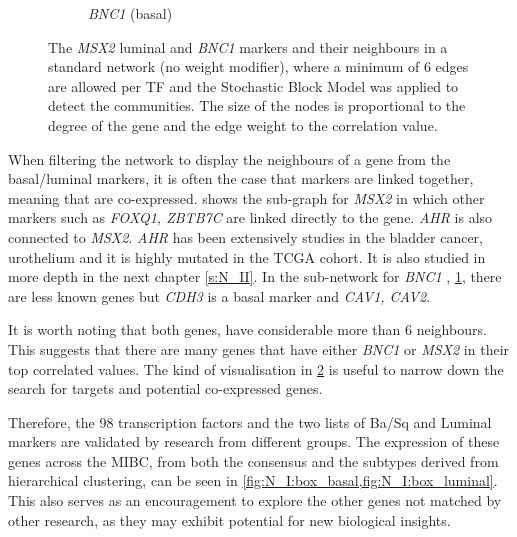 \begin{figure}[!b]
\begin{subfigure}[!t]{0.49\textwidth}
        \caption{\textit{BNC1} (basal)}
        \label{fig:N_I:net_BNC1}
    \end{subfigure}
    \caption{The \textit{MSX2} luminal and \textit{BNC1} markers and their neighbours in a standard network (no weight modifier), where a minimum of 6 edges are allowed per TF and the Stochastic Block Model was applied to detect the communities. The size of the nodes is proportional to the degree of the gene and the edge weight to the correlation value.}
    
    \label{fig:N_I:net_neighbours}
\end{figure}

When filtering the network to display the neighbours of a  gene from the basal/luminal markers, it is often the case that markers are linked together, meaning that are co-expressed.  shows the sub-graph for \textit{MSX2} in which other markers such as \textit{FOXQ1, ZBTB7C} are linked directly to the gene. \textit{AHR} is also connected to \textit{MSX2}. \textit{AHR} has been extensively studies in the bladder cancer, urothelium and it is highly mutated in the TCGA cohort. It is also studied in more depth in the next chapter \ref{s:N_II}. In the sub-network for \textit{BNC1} , \cref{fig:N_I:net_BNC1}, there are less known genes but \textit{CDH3} is a basal marker \citep{Dadhania2016-cb} and \textit{CAV1, CAV2}. 

It is worth noting that both genes, have considerable more than 6 neighbours. This suggests that there are many genes that have either \textit{BNC1} or \textit{MSX2} in their top correlated values. The kind of visualisation in \cref{fig:N_I:net_neighbours} is useful to narrow down the search for targets and potential co-expressed genes.


Therefore, the 98 transcription factors and the two lists of Ba/Sq and Luminal markers are validated by research from different groups. The expression of these genes across the MIBC, from both the consensus and the subtypes derived from hierarchical clustering, can be seen in \cref{fig:N_I:box_basal,fig:N_I:box_luminal}. This also serves as an encouragement to explore the other genes not matched by other research, as they may exhibit potential for new biological insights.


